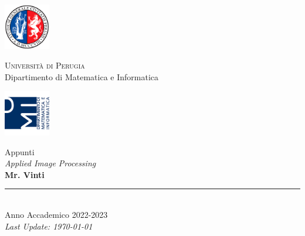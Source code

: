 
\thispagestyle{empty} %

\noindent %
\includegraphics[width=0.15\textwidth]{frontmatter/imgs/logoUniPg.jpg}
\begin{minipage}[b]{0.7\textwidth}
    \centering
    {\Large \textsc{Universit{\`a} di Perugia}}\\
    \vspace{0.4 em}
    {\large Dipartimento di Matematica e Informatica}
    \vspace{0.6 em}
\end{minipage}%
\includegraphics[width=0.15\textwidth]{frontmatter/imgs/logoDMI.jpg}

\vspace{8 em}

\begin{center}
    {\large Appunti}\\
    \vspace{2 em}
    {\Huge \textit{Applied Image Processing}}\\
    \vspace{5 em}
    {\Huge \textbf{Mr. Vinti}}\\

    \vfill

    \rule{380pt}{.4pt}\\
    \vspace{1.2 em}
    \large{Anno Accademico 2022-2023}\\
    \vspace{.9 em}
    \small{\textit{Last Update: \today{}}}
\end{center}

